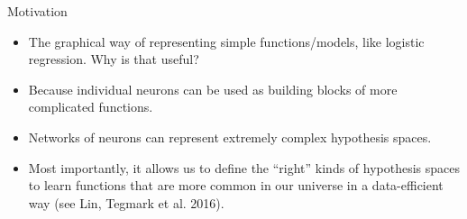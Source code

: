 







\begin{vbframe}{Motivation}
\lz
\begin{itemize}
\item The graphical way of representing simple functions/models, like logistic regression. Why is that useful?
\lz
\item Because individual neurons can be used as building blocks of more complicated functions.
\lz
\item Networks of neurons can represent extremely complex hypothesis spaces.
\lz
\item Most importantly, it allows us to define the \enquote{right} kinds of hypothesis spaces to learn functions that are more common in our universe in a data-efficient way (see Lin, Tegmark et al. 2016).
\end{itemize}
\framebreak


\end{vbframe}
